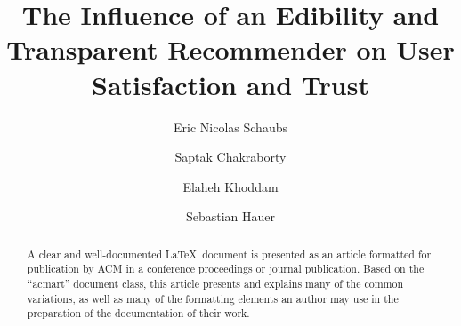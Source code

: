 \documentclass[sigconf]{acmart}
\begin{document}
\title{The Influence of an Edibility and Transparent Recommender on User Satisfaction and Trust}

\author{Eric Nicolas Schaubs}

\author{Saptak Chakraborty}

\author{Elaheh Khoddam}

\author{Sebastian Hauer}

\renewcommand{\shortauthors}{Trovato et al.}

\begin{abstract}
  A clear and well-documented \LaTeX\ document is presented as an
  article formatted for publication by ACM in a conference proceedings
  or journal publication. Based on the ``acmart'' document class, this
  article presents and explains many of the common variations, as well
  as many of the formatting elements an author may use in the
  preparation of the documentation of their work.
\end{abstract}
\end{document}
